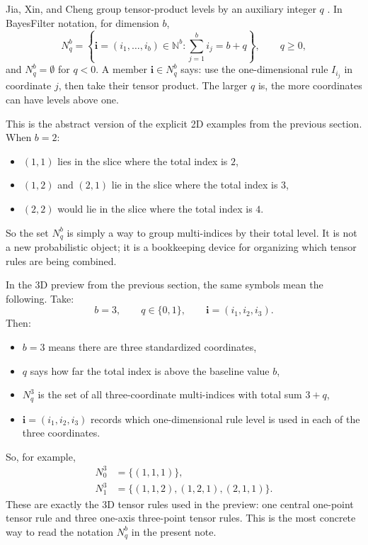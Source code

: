 \documentclass[11pt]{article}
\numberwithin{equation}{section}
\begin{document}
Jia, Xin, and Cheng group tensor-product levels by an auxiliary integer \(q\)
\cite[Eq. 27]{jia2012sparsegrid}.  In BayesFilter notation, for dimension
\(b\),
\begin{equation}
  N_q^b
  =
  \left\{\mathbf i=(i_1,\ldots,i_b)\in\mathbb N^b:
  \sum_{j=1}^b i_j=b+q\right\},
  \qquad q\ge 0,
  \label{eq:p32-Nqb}
\end{equation}
and \(N_q^b=\emptyset\) for \(q<0\).  A member
\(\mathbf i\in N_q^b\) says: use the one-dimensional rule \(I_{i_j}\) in
coordinate \(j\), then take their tensor product.  The larger \(q\) is, the
more coordinates can have levels above one.

This is the abstract version of the explicit 2D examples from the previous
section.  When \(b=2\):
\begin{itemize}[leftmargin=0.28in]
  \item \((1,1)\) lies in the slice where the total index is \(2\),
  \item \((1,2)\) and \((2,1)\) lie in the slice where the total index is
  \(3\),
  \item \((2,2)\) would lie in the slice where the total index is \(4\).
\end{itemize}
So the set \(N_q^b\) is simply a way to group multi-indices by their total
level.  It is not a new probabilistic object; it is a bookkeeping device for
organizing which tensor rules are being combined.

In the 3D preview from the previous section, the same symbols mean the following.
Take:
\begin{equation}
  b=3,
  \qquad
  q\in\{0,1\},
  \qquad
  \mathbf i=(i_1,i_2,i_3).
  \label{eq:p38-3d-index-symbols}
\end{equation}
Then:
\begin{itemize}[leftmargin=0.28in]
  \item \(b=3\) means there are three standardized coordinates,
  \item \(q\) says how far the total index is above the baseline value \(b\),
  \item \(N_q^3\) is the set of all three-coordinate multi-indices with total
  sum \(3+q\),
  \item \(\mathbf i=(i_1,i_2,i_3)\) records which one-dimensional rule level is
  used in each of the three coordinates.
\end{itemize}
So, for example,
\begin{align}
  N_0^3 &= \{(1,1,1)\},
  \label{eq:p38-N03}\\
  N_1^3 &= \{(1,1,2),(1,2,1),(2,1,1)\}.
  \label{eq:p38-N13}
\end{align}
These are exactly the 3D tensor rules used in the preview: one central
one-point tensor rule and three one-axis three-point tensor rules.  This is the
most concrete way to read the notation \(N_q^b\) in the present note.
\end{document}
